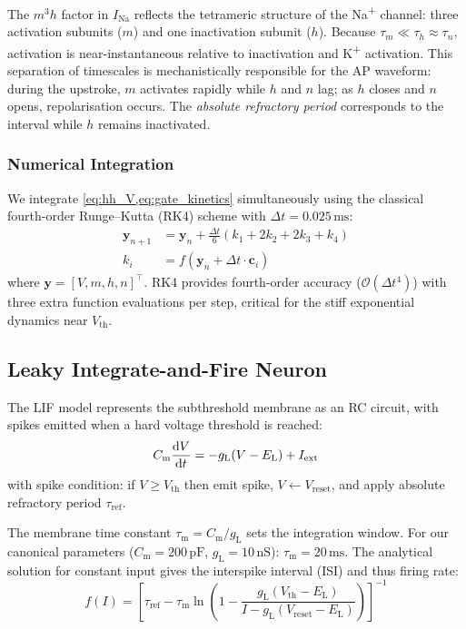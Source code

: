 \documentclass[11pt, a4paper, twocolumn]{article}
\newcommand{\Vth}{\ensuremath{V_{\mathrm{th}}}}
\newcommand{\Vreset}{\ensuremath{V_{\mathrm{reset}}}}
\newcommand{\EL}{\ensuremath{E_{\mathrm{L}}}}
\newcommand{\gL}{\ensuremath{g_{\mathrm{L}}}}
\newcommand{\Cm}{\ensuremath{C_{\mathrm{m}}}}
\newcommand{\taum}{\ensuremath{\tau_{\mathrm{m}}}}
\newcommand{\ms}{\ensuremath{\,\mathrm{ms}}}
\newcommand{\nS}{\ensuremath{\,\mathrm{nS}}}
\newcommand{\pF}{\ensuremath{\,\mathrm{pF}}}
\begin{document}
The $m^3 h$ factor in $I_{\mathrm{Na}}$ reflects the tetrameric structure of
the Na\textsuperscript{+} channel: three activation subunits ($m$) and one
inactivation subunit ($h$). Because $\tau_m \ll \tau_h \approx \tau_n$,
activation is near-instantaneous relative to inactivation and K\textsuperscript{+}
activation. This separation of timescales is mechanistically responsible for
the AP waveform: during the upstroke, $m$ activates rapidly while $h$ and $n$
lag; as $h$ closes and $n$ opens, repolarisation occurs. The \emph{absolute
refractory period} corresponds to the interval while $h$ remains
inactivated.

\subsubsection{Numerical Integration}

We integrate \cref{eq:hh_V,eq:gate_kinetics} simultaneously using the
classical fourth-order Runge--Kutta (RK4) scheme with
$\Delta t = 0.025\ms$:
\begin{align}
  \mathbf{y}_{n+1} &= \mathbf{y}_n + \frac{\Delta t}{6}(k_1 + 2k_2 + 2k_3 + k_4)
  \nonumber\\
  k_i &= f\!\left(\mathbf{y}_n + \Delta t \cdot \mathbf{c}_i\right)
  \label{eq:rk4}
\end{align}
where $\mathbf{y} = [V, m, h, n]^\top$. RK4 provides fourth-order accuracy
($\mathcal{O}(\Delta t^4)$) with three extra function evaluations per step,
critical for the stiff exponential dynamics near $V_{\mathrm{th}}$.

\subsection{Leaky Integrate-and-Fire Neuron}
\label{sec:lif}

The LIF model \citep{Lapicque1907} represents the subthreshold membrane as
an RC circuit, with spikes emitted when a hard voltage threshold is reached:
\begin{equation}
  \Cm \dv{V}{t} = -\gL(V - \EL) + I_{\mathrm{ext}}
  \label{eq:lif}
\end{equation}
with spike condition: if $V \geq \Vth$ then emit spike, $V \leftarrow \Vreset$,
and apply absolute refractory period $\tau_{\mathrm{ref}}$.

The membrane time constant $\taum = \Cm/\gL$ sets the integration window.
For our canonical parameters ($\Cm = 200\pF$, $\gL = 10\nS$): $\taum = 20\ms$.
The analytical solution for constant input gives the interspike interval
(ISI) and thus firing rate:
\begin{equation}
  f(I) = \left[\tau_{\mathrm{ref}} - \taum \ln\!\left(1 -
    \frac{\gL(\Vth - \EL)}{I - \gL(\Vreset - \EL)}\right)\right]^{-1}
  \label{eq:lif_rate}
\end{equation}
\end{document}
